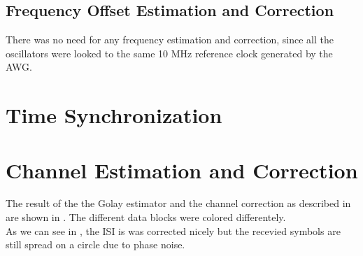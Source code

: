 \subsection{Frequency Offset Estimation and Correction}
There was no need for any frequency estimation and correction, since all the
oscillators were looked to the same 10 MHz reference clock generated
by the \gls{AWG}. \\

\section{Time Synchronization}

\section{Channel Estimation and Correction}
The result of the the Golay estimator and the channel correction
as described in  are shown in .
The different data blocks were colored differentely. \\

As we can see in , the \gls{ISI} is was
corrected nicely but the recevied symbols are still spread on a circle
due to phase noise. \\

